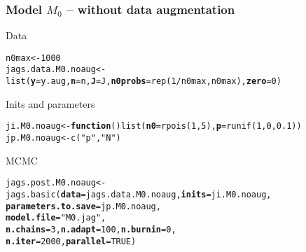 \documentclass[color=usenames,dvipsnames]{beamer}\usepackage[]{graphicx}\usepackage[]{color}
\makeatletter
\newcommand{\hlnum}[1]{\textcolor[rgb]{0.69,0.494,0}{#1}}%
\newcommand{\hlstr}[1]{\textcolor[rgb]{0.749,0.012,0.012}{#1}}%
\newcommand{\hlopt}[1]{\textcolor[rgb]{0,0,0}{#1}}%
\newcommand{\hlstd}[1]{\textcolor[rgb]{0,0,0}{#1}}%
\newcommand{\hlkwa}[1]{\textcolor[rgb]{0,0,0}{\textbf{#1}}}%
\newcommand{\hlkwb}[1]{\textcolor[rgb]{0,0.341,0.682}{#1}}%
\newcommand{\hlkwc}[1]{\textcolor[rgb]{0,0,0}{\textbf{#1}}}%
\newcommand{\hlkwd}[1]{\textcolor[rgb]{0.004,0.004,0.506}{#1}}%
\newenvironment{kframe}{%
 \def\at@end@of@kframe{}%
 \ifinner\ifhmode%
  \def\at@end@of@kframe{\end{minipage}}%
  \begin{minipage}{\columnwidth}%
 \fi\fi%
 \def\FrameCommand##1{\hskip\@totalleftmargin \hskip-\fboxsep
 \colorbox{shadecolor}{##1}\hskip-\fboxsep
     \hskip-\linewidth \hskip-\@totalleftmargin \hskip\columnwidth}%
 \MakeFramed {\advance\hsize-\width
   \@totalleftmargin\z@ \linewidth\hsize
   \@setminipage}}%
 {\par\unskip\endMakeFramed%
 \at@end@of@kframe}
\newenvironment{knitrout}{}{} %
\makeatother
\begin{document}
\begin{frame}[fragile]
  \frametitle{Model $M_0$ -- without data augmentation}
  Data
\begin{knitrout}\scriptsize
{}\color{fgcolor}\begin{kframe}
\begin{alltt}
\hlstd{n0max} \hlkwb{<-} \hlnum{1000}
\hlstd{jags.data.M0.noaug} \hlkwb{<-} \hlkwd{list}\hlstd{(}\hlkwc{y}\hlstd{=y.aug,} \hlkwc{n}\hlstd{=n,} \hlkwc{J}\hlstd{=J,} \hlkwc{n0probs}\hlstd{=}\hlkwd{rep}\hlstd{(}\hlnum{1}\hlopt{/}\hlstd{n0max, n0max),} \hlkwc{zero}\hlstd{=}\hlnum{0}\hlstd{)}
\end{alltt}
\end{kframe}
\end{knitrout}
\pause
\vfill
  Inits and parameters
\begin{knitrout}\scriptsize
{}\color{fgcolor}\begin{kframe}
\begin{alltt}
\hlstd{ji.M0.noaug} \hlkwb{<-} \hlkwa{function}\hlstd{()} \hlkwd{list}\hlstd{(}\hlkwc{n0}\hlstd{=}\hlkwd{rpois}\hlstd{(}\hlnum{1}\hlstd{,} \hlnum{5}\hlstd{),} \hlkwc{p}\hlstd{=}\hlkwd{runif}\hlstd{(}\hlnum{1}\hlstd{,} \hlnum{0}\hlstd{,} \hlnum{0.1}\hlstd{))}
\hlstd{jp.M0.noaug} \hlkwb{<-} \hlkwd{c}\hlstd{(}\hlstr{"p"}\hlstd{,} \hlstr{"N"}\hlstd{)}
\end{alltt}
\end{kframe}
\end{knitrout}
\pause
\vfill
MCMC
\begin{knitrout}\scriptsize
{}\color{fgcolor}\begin{kframe}
\begin{alltt}
\hlstd{jags.post.M0.noaug} \hlkwb{<-} \hlkwd{jags.basic}\hlstd{(}\hlkwc{data}\hlstd{=jags.data.M0.noaug,} \hlkwc{inits}\hlstd{=ji.M0.noaug,}
                                 \hlkwc{parameters.to.save}\hlstd{=jp.M0.noaug,}
                                 \hlkwc{model.file}\hlstd{=}\hlstr{"M0.jag"}\hlstd{,}
                                 \hlkwc{n.chains}\hlstd{=}\hlnum{3}\hlstd{,} \hlkwc{n.adapt}\hlstd{=}\hlnum{100}\hlstd{,} \hlkwc{n.burnin}\hlstd{=}\hlnum{0}\hlstd{,}
                                 \hlkwc{n.iter}\hlstd{=}\hlnum{2000}\hlstd{,} \hlkwc{parallel}\hlstd{=}\hlnum{TRUE}\hlstd{)}
\end{alltt}
\end{kframe}
\end{knitrout}
\end{frame}
\end{document}
